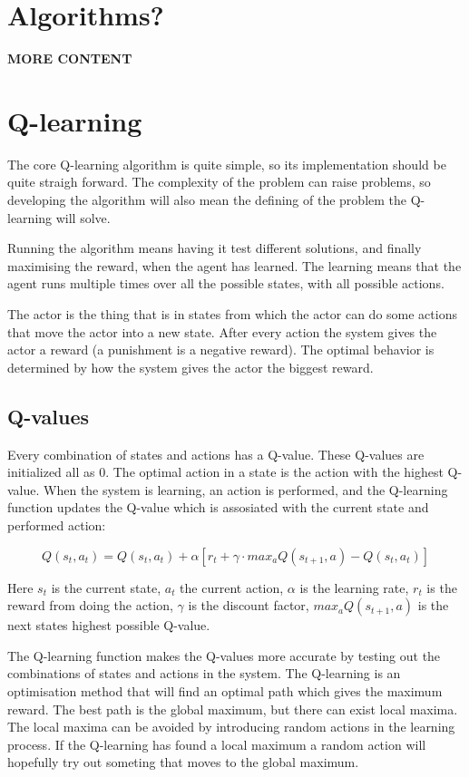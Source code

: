 \documentclass{article}
\begin{document}
\section{Algorithms?}
\textbf{MORE CONTENT}



\section{Q-learning}
The core Q-learning algorithm is quite simple, so its implementation should
be quite straigh forward. The complexity of the problem can raise problems,
so developing the algorithm will also mean the defining of
the problem the Q-learning will solve.

Running the algorithm means having it test different solutions, and finally
maximising the reward, when the agent has learned. The learning means
that the agent runs multiple times over all the possible states,
with all possible actions.

The actor is the thing that is in states from which the actor can do some
actions that move the actor into a new state. After every action the
system gives the actor a reward (a punishment is a negative reward).
The optimal behavior is determined by how the system gives the actor the
biggest reward.


\subsection{Q-values}
Every combination of states and actions has a Q-value. These Q-values are
initialized all as 0. The optimal action in a state is the action with the
highest Q-value. When the system is learning, an action is performed, and the
Q-learning function updates the Q-value which is assosiated with the current
state and performed action:

\[Q(s_t, a_t) = Q(s_t, a_t) + \alpha [ r_t + \gamma \cdot max_aQ(s_{t+1}, a)
- Q(s_t, a_t) ]\]

Here $s_t$ is the current state, $a_t$ the current action,
$\alpha$ is the learning rate, $r_t$ is the reward from doing the action,
$\gamma$ is the discount factor, $max_aQ(s_{t+1}, a)$ is the next states
highest possible Q-value.

The Q-learning function makes the Q-values more accurate by testing out
the combinations of states and actions in the system. The Q-learning is an
optimisation method that will find an optimal path which gives the maximum
reward. The best path is the global maximum, but there can exist local maxima.
The local maxima can be avoided by introducing random actions in the learning
process. If the Q-learning has found a local maximum a random action will
hopefully try out someting that moves to the global maximum.
\end{document}
